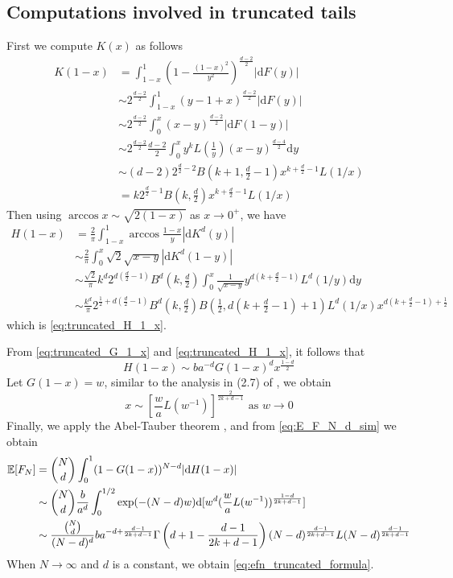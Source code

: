 \documentclass{aptpub}
\def\E{\mathbb{E}}
\def\d{\mathrm{d}}
\begin{document}
\subsection{Computations involved in truncated tails}
First we compute $K(x)$ as follows
\begin{align*}
    K(1-x)  & = \int_{1-x}^1 \left(1-\frac{(1-x)^2}{y^2}\right)^{\frac{d-2}{2}} |\d F(y)| \\
    & \sim 2^{\frac{d-2}{2}} \int_{1-x}^1 (y-1+x)^{\frac{d-2}{2}} |\d F(y)| \\
    & \sim 2^{\frac{d-2}{2}} \int_0^x (x-y)^{\frac{d-2}{2}} |\d F(1-y)| \\
    & \sim 2^{\frac{d-2}{2}} \frac{d-2}{2} \int_0^x y^k L(\frac{1}{y}) (x-y)^{\frac{d-4}{2}} \d y\\
    & \sim (d-2)2^{\frac{d}{2}-2} B(k+1,\frac{d}{2}-1)x^{k+\frac{d}{2}-1}L(1/x)\\
    & = k 2^{\frac{d}{2}-1} B(k, \frac{d}{2}) x^{k+\frac{d}{2}-1} L(1/x) 
\end{align*}
Then using $\arccos x \sim \sqrt{2(1-x)}$ as $x\to 0^+$,
we have
\begin{align*}
     H(1-x) & = \frac{2}{\pi} \int_{1-x}^{1}
     \arccos\frac{1-x}{y}
     |\d K^d(y)| \\
     &\sim \frac{2}{\pi}\int_0^x \sqrt{2}\sqrt{x-y} |\d K^d(1-y)| \\
     &\sim \frac{\sqrt{2}}{\pi} k^d
     2^{d(\frac{d}{2}-1)} B^d(k, \frac{d}{2})
      \int_0^x \frac{1}{\sqrt{x-y}} y^{d(k+\frac{d}{2}-1)} L^d(1/y) \d y\\
     &\sim \frac{k^d}{\pi}
     2^{\frac{1}{2} + d(\frac{d}{2}-1)} B^d(k, \frac{d}{2})
     B\left( \frac{1}{2},
     d(k+\frac{d}{2} -1)+1 \right) L^d(1/x) x^{d(k+\frac{d}{2}-1)+\frac{1}{2}}
\end{align*}
which is \eqref{eq:truncated_H_1_x}.

From \eqref{eq:truncated_G_1_x} and \eqref{eq:truncated_H_1_x}, it follows that
\begin{equation}
    H(1-x) \sim ba^{-d} G(1-x)^d x^{\frac{1-d}{2}}
\end{equation}
Let $G(1-x)=w$, similar to the analysis in (2.7) of
\cite{carnal1970konvexe}, we obtain
\begin{equation*}
     x \sim [\frac{w}{a} L(w^{-1})]^{\frac{2}{2k+d-1}} \textrm{ as } w \to 0
\end{equation*}
Finally, 
we apply the Abel-Tauber theorem
\cite{omey1989abelian}, and from \eqref{eq:E_F_N_d_sim} we obtain
\begin{align}
    \E[F_N] &= \binom{N}{d}\int_0^1 (1 - G(1-x))^{N-d} |\d H(1-x)| 
    \notag \\
    & \sim \binom{N}{d} \frac{b}{a^d} \int_0^{1/2} \exp(-(N-d)w) \d [w^d (\frac{w}{a} L(w^{-1}))^{\frac{1-d}{2k+d-1}} ]
    \notag \\
    &\sim \frac{\binom{N}{d}}{(N-d)^d} ba^{-d+\frac{d-1}{2k+d-1}}
    \Gamma 
    \left(d+1-\frac{d-1}{2k+d-1}\right)
    (N-d)^{\frac{d-1}{2k+d-1}}
    L(N-d)
    ^{\frac{d-1}{2k+d-1}}
    \label{eq:intermediate_efn_truncated}
\end{align}
When $N\to \infty$ and $d$ is a constant, we obtain \eqref{eq:efn_truncated_formula}.
\end{document}
